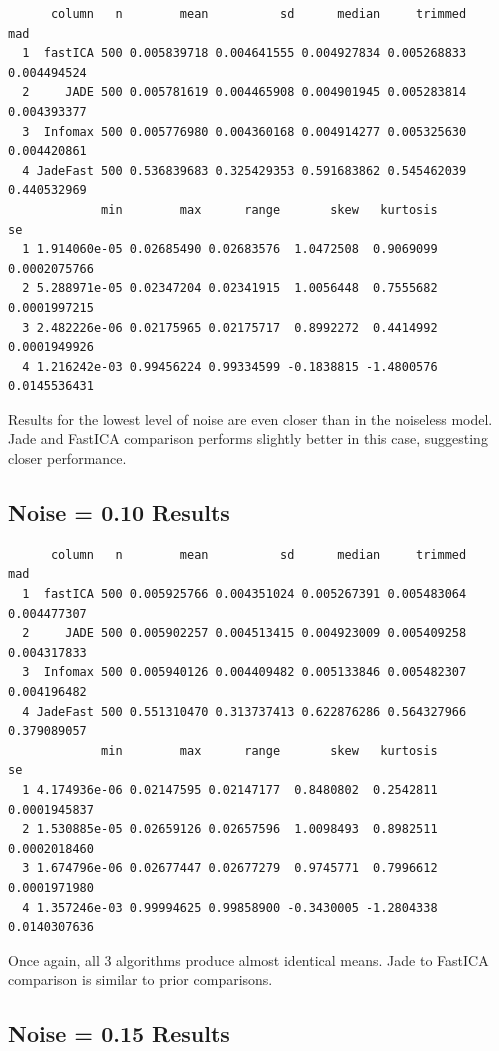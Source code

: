 \documentclass[12pt,twoside]{amherstthesis}
\begin{document}
  \begin{verbatim}
      column   n        mean          sd      median     trimmed         mad
  1  fastICA 500 0.005839718 0.004641555 0.004927834 0.005268833 0.004494524
  2     JADE 500 0.005781619 0.004465908 0.004901945 0.005283814 0.004393377
  3  Infomax 500 0.005776980 0.004360168 0.004914277 0.005325630 0.004420861
  4 JadeFast 500 0.536839683 0.325429353 0.591683862 0.545462039 0.440532969
             min        max      range       skew   kurtosis           se
  1 1.914060e-05 0.02685490 0.02683576  1.0472508  0.9069099 0.0002075766
  2 5.288971e-05 0.02347204 0.02341915  1.0056448  0.7555682 0.0001997215
  3 2.482226e-06 0.02175965 0.02175717  0.8992272  0.4414992 0.0001949926
  4 1.216242e-03 0.99456224 0.99334599 -0.1838815 -1.4800576 0.0145536431
  \end{verbatim}
  
  Results for the lowest level of noise are even closer than in the
  noiseless model. Jade and FastICA comparison performs slightly better in
  this case, suggesting closer performance.
  
  \subsection{Noise = 0.10 Results}\label{noise-0.10-results-1}
  
  \begin{verbatim}
      column   n        mean          sd      median     trimmed         mad
  1  fastICA 500 0.005925766 0.004351024 0.005267391 0.005483064 0.004477307
  2     JADE 500 0.005902257 0.004513415 0.004923009 0.005409258 0.004317833
  3  Infomax 500 0.005940126 0.004409482 0.005133846 0.005482307 0.004196482
  4 JadeFast 500 0.551310470 0.313737413 0.622876286 0.564327966 0.379089057
             min        max      range       skew   kurtosis           se
  1 4.174936e-06 0.02147595 0.02147177  0.8480802  0.2542811 0.0001945837
  2 1.530885e-05 0.02659126 0.02657596  1.0098493  0.8982511 0.0002018460
  3 1.674796e-06 0.02677447 0.02677279  0.9745771  0.7996612 0.0001971980
  4 1.357246e-03 0.99994625 0.99858900 -0.3430005 -1.2804338 0.0140307636
  \end{verbatim}
  
  Once again, all 3 algorithms produce almost identical means. Jade to
  FastICA comparison is similar to prior comparisons.
  
  \subsection{Noise = 0.15 Results}\label{noise-0.15-results-1}
  
\end{document}
